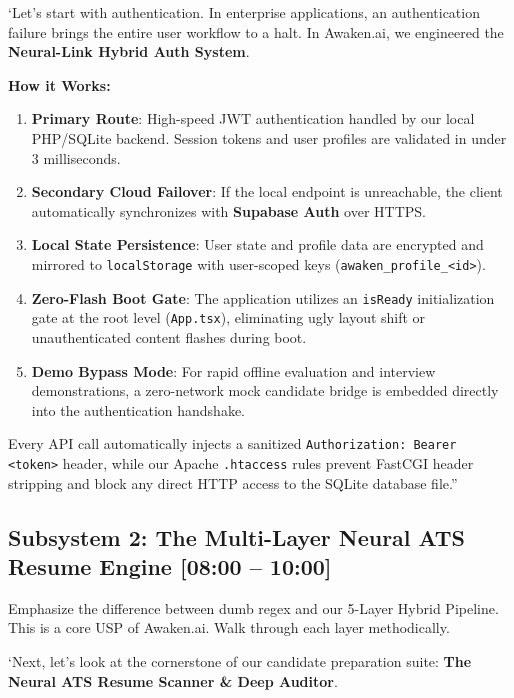 \documentclass[11pt,a4paper]{article}
\begin{document}
`Let's start with authentication. In enterprise applications, an authentication failure brings the entire user workflow to a halt. In Awaken.ai, we engineered the \textbf{Neural-Link Hybrid Auth System}.

\textbf{How it Works:}
\begin{enumerate}[leftmargin=*]
    \item \textbf{Primary Route}: High-speed JWT authentication handled by our local PHP/SQLite backend. Session tokens and user profiles are validated in under 3 milliseconds.
    \item \textbf{Secondary Cloud Failover}: If the local endpoint is unreachable, the client automatically synchronizes with \textbf{Supabase Auth} over HTTPS.
    \item \textbf{Local State Persistence}: User state and profile data are encrypted and mirrored to \texttt{localStorage} with user-scoped keys (\texttt{awaken\_profile\_<id>}).
    \item \textbf{Zero-Flash Boot Gate}: The application utilizes an \texttt{isReady} initialization gate at the root level (\texttt{App.tsx}), eliminating ugly layout shift or unauthenticated content flashes during boot.
    \item \textbf{Demo Bypass Mode}: For rapid offline evaluation and interview demonstrations, a zero-network mock candidate bridge is embedded directly into the authentication handshake.
\end{enumerate}

Every API call automatically injects a sanitized \texttt{Authorization: Bearer <token>} header, while our Apache \texttt{.htaccess} rules prevent FastCGI header stripping and block any direct HTTP access to the SQLite database file.''

\vspace{0.5em}

\subsection{Subsystem 2: The Multi-Layer Neural ATS Resume Engine [08:00 -- 10:00]}

\begin{speakercue}{Emphasize the difference between dumb regex and our 5-Layer Hybrid Pipeline.}
This is a core USP of Awaken.ai. Walk through each layer methodically.
\end{speakercue}

`Next, let's look at the cornerstone of our candidate preparation suite: \textbf{The Neural ATS Resume Scanner \& Deep Auditor}.
\end{document}
